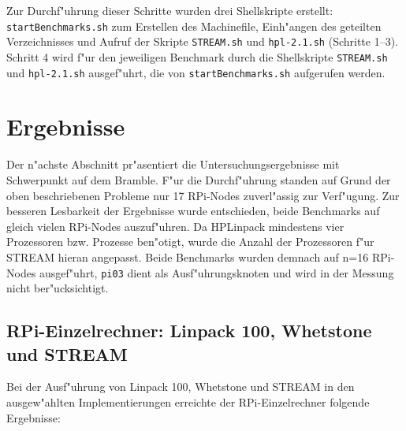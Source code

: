 \noindent
Zur Durchf"uhrung dieser Schritte wurden drei Shellskripte erstellt: \texttt{startBenchmarks.sh} zum Erstellen des Machinefile, Einh"angen des geteilten Verzeichnisses und Aufruf der Skripte \texttt{STREAM.sh} und \texttt{hpl-2.1.\-sh} (Schritte 1--3). Schritt 4 wird f"ur den jeweiligen Benchmark durch die Shellskripte \texttt{STREAM.sh} und \texttt{hpl-2.1.sh} ausgef"uhrt, die von \texttt{startBenchmarks.sh} aufgerufen werden. 

\section{Ergebnisse}\label{Ergebnisse}

Der n"achste Abschnitt pr"asentiert die Untersuchungsergebnisse mit Schwerpunkt auf dem Bramble. F"ur die Durchf"uhrung standen auf Grund der oben beschriebenen Probleme nur 17 RPi-Nodes zuverl"assig zur Verf"ugung. Zur besseren Lesbarkeit der Ergebnisse wurde entschieden, beide Benchmarks auf gleich vielen RPi-Nodes auszuf"uhren. Da HPLinpack mindestens vier Prozessoren bzw. Prozesse ben"otigt, wurde die Anzahl der Prozessoren f"ur STREAM hieran angepasst. Beide Benchmarks wurden demnach auf n=16 RPi-Nodes ausgef"uhrt, \texttt{pi03} dient als Ausf"uhr\-ungsknoten und wird in der Messung nicht ber"ucksichtigt.

\subsection{RPi-Einzelrechner: Linpack 100, Whetstone und STREAM}\label{rpi-ergebnisse}

Bei der Ausf"uhrung von Linpack 100, Whetstone und STREAM in den ausgew"ahlten Implementierungen erreichte der RPi-Einzelrechner folgende Ergebnisse: 

